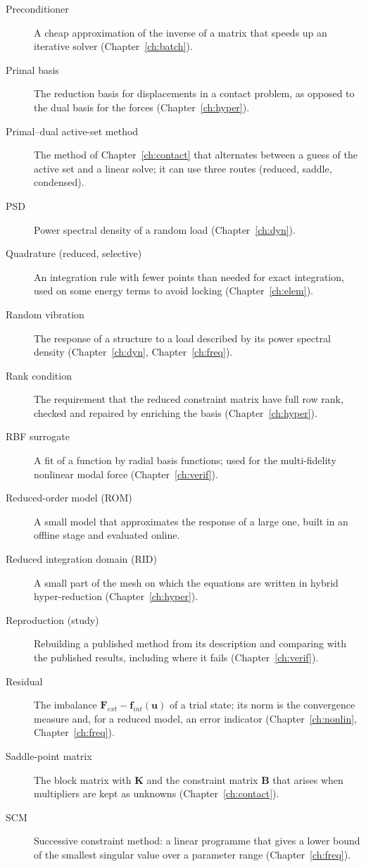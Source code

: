 \begin{description}
\item[Preconditioner] A cheap approximation of the inverse of a matrix that speeds up an iterative solver (Chapter~\ref{ch:batch}).
\item[Primal basis] The reduction basis for displacements in a contact problem, as opposed to the dual basis for the forces (Chapter~\ref{ch:hyper}).
\item[Primal--dual active-set method] The method of Chapter~\ref{ch:contact} that alternates between a guess of the active set and a linear solve; it can use three routes (reduced, saddle, condensed).
\item[PSD] Power spectral density of a random load (Chapter~\ref{ch:dyn}).
\item[Quadrature (reduced, selective)] An integration rule with fewer points than needed for exact integration, used on some energy terms to avoid locking (Chapter~\ref{ch:elem}).
\item[Random vibration] The response of a structure to a load described by its power spectral density (Chapter~\ref{ch:dyn}, Chapter~\ref{ch:freq}).
\item[Rank condition] The requirement that the reduced constraint matrix have full row rank, checked and repaired by enriching the basis (Chapter~\ref{ch:hyper}).
\item[RBF surrogate] A fit of a function by radial basis functions; used for the multi-fidelity nonlinear modal force (Chapter~\ref{ch:verif}).
\item[Reduced-order model (ROM)] A small model that approximates the response of a large one, built in an offline stage and evaluated online.
\item[Reduced integration domain (RID)] A small part of the mesh on which the equations are written in hybrid hyper-reduction (Chapter~\ref{ch:hyper}).
\item[Reproduction (study)] Rebuilding a published method from its description and comparing with the published results, including where it fails (Chapter~\ref{ch:verif}).
\item[Residual] The imbalance $\bm F_{ext}-\bm f_{int}(\bm u)$ of a trial state; its norm is the convergence measure and, for a reduced model, an error indicator (Chapter~\ref{ch:nonlin}, Chapter~\ref{ch:freq}).
\item[Saddle-point matrix] The block matrix with $\bm K$ and the constraint matrix $\bm B$ that arises when multipliers are kept as unknowns (Chapter~\ref{ch:contact}).
\item[SCM] Successive constraint method: a linear programme that gives a lower bound of the smallest singular value over a parameter range (Chapter~\ref{ch:freq}).

\end{description}
